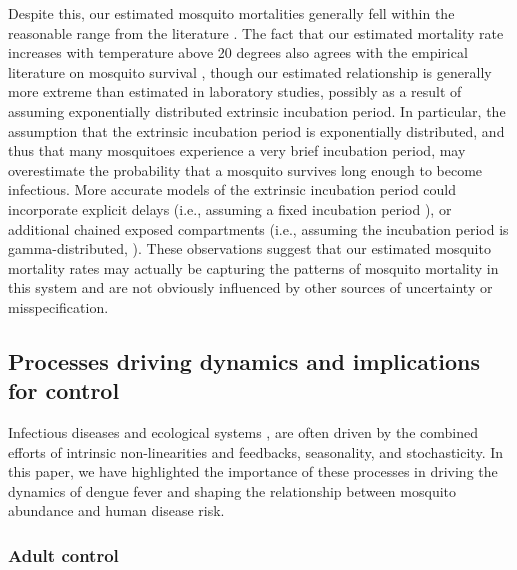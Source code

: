 \documentclass[10pt,letterpaper]{article}
\begin{document}
Despite this, our estimated mosquito mortalities generally fell within the reasonable range from the literature \cite{Maciel-de-Freitas2008, Brady2013}.
The fact that our estimated mortality rate increases with temperature above 20 degrees also agrees with the empirical literature on mosquito survival \cite{Yang2009}, though our estimated relationship is generally more extreme than estimated in laboratory studies, possibly as a result of assuming exponentially distributed extrinsic incubation period.
In particular, the assumption that the extrinsic incubation period is exponentially distributed, and thus that many mosquitoes experience a very brief incubation period, may overestimate the probability that a mosquito survives long enough to become infectious.
More accurate models of the extrinsic incubation period could incorporate explicit delays (i.e., assuming a fixed incubation period \cite{Burattini2008}), or additional chained exposed compartments (i.e., assuming the incubation period is gamma-distributed, \cite{Lloyd2001}).
These observations suggest that our estimated mosquito mortality rates may actually be capturing the patterns of mosquito mortality in this system and are not obviously influenced by other sources of uncertainty or misspecification.

\subsection*{Processes driving dynamics and implications for control}

Infectious diseases \cite{Ellner1998,Koelle2004} and ecological systems \cite{Bjornstad2001}, are often driven by the combined efforts of intrinsic non-linearities and feedbacks, seasonality, and stochasticity.
In this paper, we have highlighted the importance of these processes in driving the dynamics of dengue fever and shaping the relationship between mosquito abundance and human disease risk.

\subsubsection*{Adult control}
\end{document}

